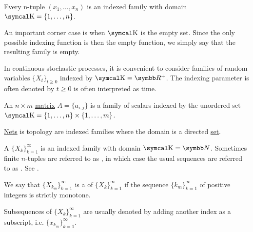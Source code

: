 \begin{example}\label{ex:indexed_families}
  \mbox{}
  \begin{DefEnum}
    \item Every n-tuple \( (x_1, \ldots, x_n) \) is an indexed family with domain \( \CK = \{ 1, \ldots, n \} \).

    \item An important corner case is when \( \CK \) is the empty set. Since the only possible indexing function is then the empty function, we simply say that the resulting family is empty.

    \item In continuous stochastic processes, it is convenient to consider families of random variables \( \{ X_t \}_{t \geq 0} \) indexed by \( \CK = \BR^+ \). The indexing parameter is often denoted by \( t \geq 0 \) is often interpreted as time.

    \item An \( n \times m \) \hyperref[def:array/matrix]{matrix} \( A = \{ a_{i,j} \} \) is a family of scalars indexed by the unordered set \( \CK = \{ 1, \ldots, n \} \times \{ 1, \ldots, m \} \).

    \item \hyperref[def:topological_net]{Nets} is topology are indexed families where the domain is a directed \hyperref[def:directed_set]{set}.
  \end{DefEnum}
\end{example}

\begin{definition}\label{def:sequence}
  A  \( \{ X_k \}_{k=1}^\infty \) is an indexed family with domain \( \CK = \BN \). Sometimes finite \( n \)-tuples are referred to as , in which case the usual sequences are referred to as . See .

  We say that \( \{ X_{k_m} \}_{k=1}^\infty \) is a  of \( \{ X_k \}_{k=1}^\infty \) if the sequence \( \{ k_m \}_{k=1}^\infty \) of positive integers is strictly monotone.

  Subsequences of \( \{ X_k \}_{k=1}^\infty \) are usually denoted by adding another index as a subscript, i.e. \( \{ x_{k_m} \}_{k=1}^\infty \).
\end{definition}

